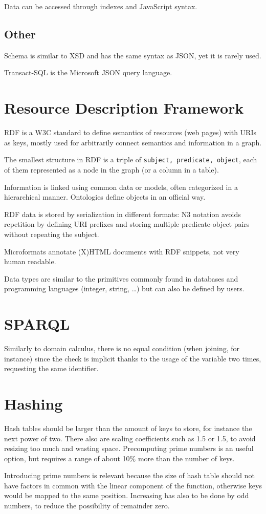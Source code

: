 Data can be accessed through indexes and JavaScript syntax.

\subsection{Other}
Schema is similar to XSD and has the same syntax as JSON, yet it is rarely used.

Transact-SQL is the Microsoft JSON query language.

\section{Resource Description Framework}
RDF is a W3C standard to define semantics of resources (web pages) with URIs as keys, mostly used for arbitrarily connect semantics and information in a graph. 

The smallest structure in RDF is a triple of \texttt{subject, predicate, object}, each of them represented as a node in the graph (or a column in a table). 

Information is linked using common data or models, often categorized in a hierarchical manner. Ontologies define objects in an official way.

RDF data is stored by serialization in different formats: N3 notation avoids repetition by defining URI prefixes and storing multiple predicate-object pairs without repeating the subject.

Microformats annotate (X)HTML documents with RDF snippets, not very human readable. 

Data types are similar to the primitives commonly found in databases and programming languages (integer, string, \dots) but can also be defined by users. 



\section{SPARQL}
Similarly to domain calculus, there is no equal condition (when joining, for instance) since the check is implicit thanks to the usage of the variable two times, requesting the same identifier. 


\section{Hashing}
Hash tables should be larger than the amount of keys to store, for instance the next power of two. There also are scaling coefficients such as 1.5 or 1.5, to avoid resizing too much and wasting space. Precomputing prime numbers is an useful option, but requires a range of about 10\% more than the number of keys. 

Introducing prime numbers is relevant because the size of hash table should not have factors in common with the linear component of the function, otherwise keys would be mapped to the same position. Increasing has also to be done by odd numbers, to reduce the possibility of remainder zero. 


